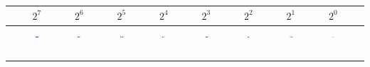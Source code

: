 \documentclass[10pt,a4paper,boxed]{hmcpset}
\begin{document}
\pagebreak

\begin{problem}[Assignment 14]
\end{problem}
	\begin{table}[h!]
		\centering
		\begin{tabular}{|c|c|c|c|c|c|c|c|c|c|}
		\hline  & $2^7$ & $2^6$ & $2^5$ & $2^4$ & $2^3$ & $2^2$ & $2^1$ & $2^0$ &  \\ 
		\hline  & \includegraphics[width=0.08\textwidth]{img/7B} & \includegraphics[width=0.08\textwidth]{img/6B} & \includegraphics[width=0.08\textwidth]{img/5B} & \includegraphics[width=0.08\textwidth]{img/4B} & \includegraphics[width=0.08\textwidth]{img/3B} & \includegraphics[width=0.08\textwidth]{img/2B} & \includegraphics[width=0.08\textwidth]{img/1B} & \includegraphics[width=0.08\textwidth]{img/0B} &  \\ 
		\hline
		\hline  & \includegraphics[width=0.03\textwidth]{img/0.pdf} & \includegraphics[width=0.03\textwidth]{img/0.pdf} & \includegraphics[width=0.03\textwidth]{img/0.pdf} & \includegraphics[width=0.03\textwidth]{img/0.pdf} & \includegraphics[width=0.03\textwidth]{img/0.pdf} & \includegraphics[width=0.03\textwidth]{img/0.pdf} & \includegraphics[width=0.03\textwidth]{img/0.pdf} & \includegraphics[width=0.03\textwidth]{img/0.pdf} &  \\ 

\end{tabular}
\end{table}
\end{document}
